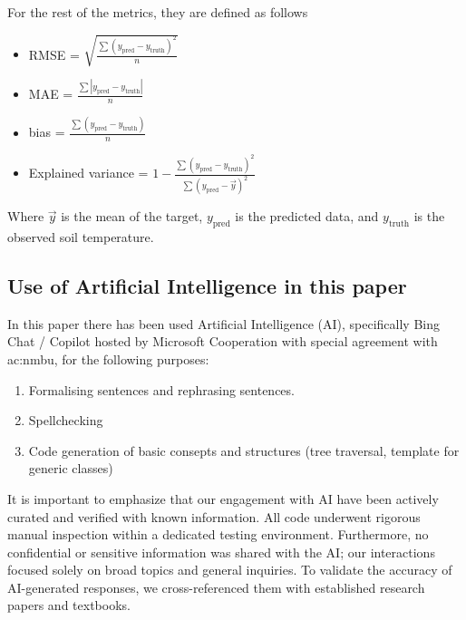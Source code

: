 For the rest of the metrics, they are defined as follows
\begin{itemize}
	\item RMSE = $\sqrt{\frac{\sum (y_{\text{pred}} - y_{\text{truth}})^2}{n}}$
	\item MAE = $\frac{\sum \left| y_{\text{pred}} - y_{\text{truth}}\right|}{n}$
	\item bias = $\frac{\sum ( y_{\text{pred}} - y_{\text{truth}})}{n}$
	\item Explained variance = $1-\frac{\sum (y_{\text{pred}} - y_{\text{truth}})^2}{\sum (y_{\text{pred}} - \vec{y})^2}$
\end{itemize}

Where $\vec{y}$ is the mean of the target, $y_{\text{pred}}$ is the predicted data, and $y_{\text{truth}}$ is the observed soil temperature.

\subsection[Use of AI]{Use of Artificial Intelligence in this paper}

In this paper there has been used Artificial Intelligence (AI), specifically Bing Chat / Copilot hosted by Microsoft Cooperation with special agreement with \acrfull{ac:nmbu}, for the following purposes:

\begin{enumerate}
	\item Formalising sentences and rephrasing sentences.
	\item Spellchecking
	\item Code generation of basic consepts and structures (tree traversal, template for generic classes) 
\end{enumerate}

It is important to emphasize that our engagement with AI have been actively curated and verified with known information. All code underwent rigorous manual inspection within a dedicated testing environment. Furthermore, no confidential or sensitive information was shared with the AI; our interactions focused solely on broad topics and general inquiries. To validate the accuracy of AI-generated responses, we cross-referenced them with established research papers and textbooks.
